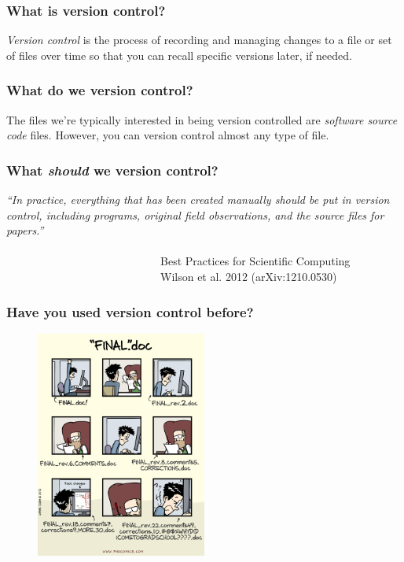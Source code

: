 \documentclass{beamer}
\begin{document}
\begin{frame}
   \frametitle{What is version control?}
   \textit{Version control} is the process of recording and managing 
   changes to a file or set of files over time so that you can recall 
   specific versions later, if needed.
\end{frame}

\begin{frame}
   \frametitle{What do we version control?}
   The files we're typically interested in being version 
   controlled are \textit{software source code} files. However, you can 
   version control almost any type of file.
   
\end{frame}

\begin{frame}
   \frametitle{What \textit{should} we version control?}
   \textit{``In practice, everything that has been created manually should be
   put in version control, including programs, original field 
   observations, and the source files for papers.''} 
   \\ \ \\
   \ \ \ \ \ \ \ \ \ \ \ \ \ \ \ \ \ \ \ \ \ \ \ \ \ \ \ \ 
   Best Practices for Scientific Computing \\
   \ \ \ \ \ \ \ \ \ \ \ \ \ \ \ \ \ \ \ \ \ \ \ \ \ \ \ \ 
   Wilson et al. 2012 (arXiv:1210.0530)
\end{frame}

\begin{frame}
   \frametitle{Have you used version control before?}
   \begin{figure}[htbp]
      \includegraphics[width=0.5\textwidth]{images/version-control-phdcomics.png}
   \end{figure}
\end{frame}
\end{document}
